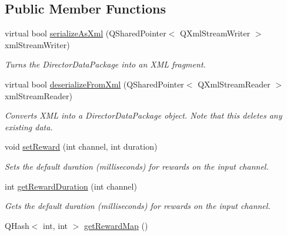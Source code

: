 \subsection*{Public Member Functions}
\begin{DoxyCompactItemize}
\item 
\hypertarget{class_picto_1_1_director_data_aae2a42fd3baa601ad8034f6d3794bcd8}{virtual bool \hyperlink{class_picto_1_1_director_data_aae2a42fd3baa601ad8034f6d3794bcd8}{serialize\-As\-Xml} (Q\-Shared\-Pointer$<$ Q\-Xml\-Stream\-Writer $>$ xml\-Stream\-Writer)}\label{class_picto_1_1_director_data_aae2a42fd3baa601ad8034f6d3794bcd8}

\begin{DoxyCompactList}\small\item\em Turns the Director\-Data\-Package into an X\-M\-L fragment. \end{DoxyCompactList}\item 
\hypertarget{class_picto_1_1_director_data_abe56f09b0d67a9ddc42c0cad9178e2b2}{virtual bool \hyperlink{class_picto_1_1_director_data_abe56f09b0d67a9ddc42c0cad9178e2b2}{deserialize\-From\-Xml} (Q\-Shared\-Pointer$<$ Q\-Xml\-Stream\-Reader $>$ xml\-Stream\-Reader)}\label{class_picto_1_1_director_data_abe56f09b0d67a9ddc42c0cad9178e2b2}

\begin{DoxyCompactList}\small\item\em Converts X\-M\-L into a Director\-Data\-Package object. Note that this deletes any existing data. \end{DoxyCompactList}\item 
\hypertarget{class_picto_1_1_director_data_a4b4ffd5e8085d8588b8845749b5072df}{void \hyperlink{class_picto_1_1_director_data_a4b4ffd5e8085d8588b8845749b5072df}{set\-Reward} (int channel, int duration)}\label{class_picto_1_1_director_data_a4b4ffd5e8085d8588b8845749b5072df}

\begin{DoxyCompactList}\small\item\em Sets the default duration (milliseconds) for rewards on the input channel. \end{DoxyCompactList}\item 
\hypertarget{class_picto_1_1_director_data_ad877271941c107def8c7176719441a7d}{int \hyperlink{class_picto_1_1_director_data_ad877271941c107def8c7176719441a7d}{get\-Reward\-Duration} (int channel)}\label{class_picto_1_1_director_data_ad877271941c107def8c7176719441a7d}

\begin{DoxyCompactList}\small\item\em Gets the default duration (milliseconds) for rewards on the input channel. \end{DoxyCompactList}\item 
\hypertarget{class_picto_1_1_director_data_a721cd3efd2a2aef8d3611dd5324ff7b1}{Q\-Hash$<$ int, int $>$ \hyperlink{class_picto_1_1_director_data_a721cd3efd2a2aef8d3611dd5324ff7b1}{get\-Reward\-Map} ()}\label{class_picto_1_1_director_data_a721cd3efd2a2aef8d3611dd5324ff7b1}


\end{DoxyCompactItemize}
